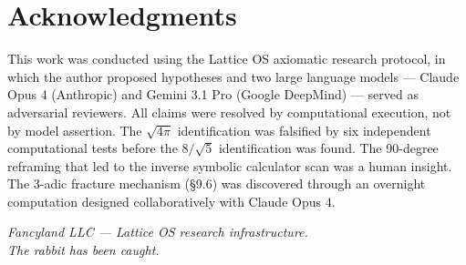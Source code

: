 \documentclass[11pt,letterpaper]{article}
\theoremstyle{definition}
\begin{document}
\section*{Acknowledgments}

This work was conducted using the Lattice OS axiomatic research protocol, in which the author proposed hypotheses and two large language models --- Claude Opus 4 (Anthropic) and Gemini 3.1 Pro (Google DeepMind) --- served as adversarial reviewers. All claims were resolved by computational execution, not by model assertion. The $\sqrt{4\pi}$ identification was falsified by six independent computational tests before the $8/\sqrt{5}$ identification was found. The 90-degree reframing that led to the inverse symbolic calculator scan was a human insight. The 3-adic fracture mechanism (\S9.6) was discovered through an overnight computation designed collaboratively with Claude Opus 4.

\vspace{2em}
\begin{center}
\textit{Fancyland LLC --- Lattice OS research infrastructure.}\\[0.5em]
\textit{The rabbit has been caught.}
\end{center}
\end{document}
